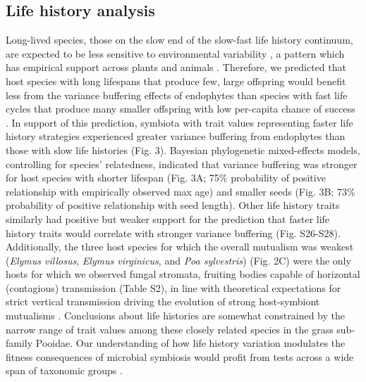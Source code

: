 \documentclass[9pt,twocolumn,twoside]{pnas-new}
\begin{document}
\subsection*{Life history analysis}
Long-lived species, those on the slow end of the slow-fast life history continuum, are expected to be less sensitive to environmental variability \cite{murphy1968pattern}, a pattern which has empirical support across plants \cite{compagnoni2021herbaceous} and animals \cite{le2022life,morris2008longevity}.
Therefore, we predicted that host species with long lifespans that produce few, large offspring would benefit less from the variance buffering effects of endophytes than species with fast life cycles that produce many smaller offspring with low per-capita chance of success \cite{rees1996evolutionary,moles2004seedling}.
In support of this prediction, symbiota with trait values representing faster life history strategies experienced greater variance buffering from endophytes than those with slow life histories (Fig. 3).
Bayesian phylogenetic mixed-effects models, controlling for species' relatedness, indicated that variance buffering was stronger for host species with shorter lifespan (Fig. 3A; 75\% probability of positive relationship with empirically observed max age) and smaller seeds (Fig. 3B; 73\% probability of positive relationship with seed length).
Other life history traits similarly had positive but weaker support for the prediction that faster life history traits would correlate with stronger variance buffering (Fig. S26-S28).
Additionally, the three host species for which the overall mutualism was weakest (\emph{Elymus villosus}, \emph{Elymus virginicus}, and \emph{Poa sylvestris}) (Fig. 2C) were the only hosts for which we observed fungal stromata, fruiting bodies capable of horizontal (contagious) transmission (Table S2), in line with theoretical expectations for strict vertical transmission driving the evolution of strong host-symbiont mutualisms \cite{fine1975vectors, afkhami2008symbiosis}.
Conclusions about life histories are somewhat constrained by the narrow range of trait values among these closely related species in the grass sub-family Pooidae. 
Our understanding of how life history variation modulates the fitness consequences of microbial symbiosis would profit from tests across a wide span of taxonomic groups \cite{jeschke2009roles}.
\end{document}
